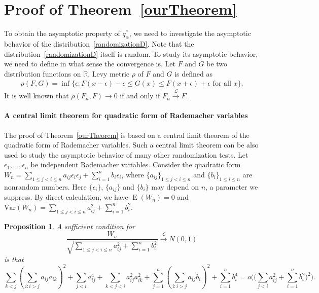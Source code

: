 \documentclass[3p]{elsarticle}
\DeclareMathOperator{\myE}{E}
\theoremstyle{plain}
\newtheorem{proposition}{\quad\quad Proposition}
\theoremstyle{definition}
\theoremstyle{remark}
\begin{document}
\section{Proof of Theorem~\ref{ourTheorem}}



To obtain the asymptotic property of $q^*_{\alpha}$, we need to investigate the asymptotic behavior of the distribution~\eqref{randomizationD}.
Note that the distribution~\eqref{randomizationD} itself is random.  To study its asymptotic behavior, we need to define in what sense the convergence is. Let $F$ and $G$ be two distribution functions on $\mathbb{R}$, Levy metric $\rho$ of $F$ and $G$ is defined as
    \begin{equation*}
    \begin{aligned}
        \rho(F,G)
        =\inf\{\epsilon:F(x-\epsilon)-\epsilon\leq G(x)\leq F(x+\epsilon)+\epsilon  \textrm{ for all } x\}.
    \end{aligned}
    \end{equation*}
It is well known that $\rho(F_n,F)\to 0$ if and only if  $F_n\xrightarrow{\mathcal{L}}F$.

\paragraph{A central limit theorem for quadratic form of Rademacher variables}
The proof of Theorem~\ref{ourTheorem} is based on a central limit theorem of the quadratic form of Rademacher variables. 
Such a central limit theorem can be also used to study the asymptotic behavior of many other randomization tests.
 Let $\epsilon_1,\ldots,\epsilon_n$ be independent Rademacher  variables. 
 Consider the quadratic form $W_n=\sum_{1\leq j<i\leq n} a_{ij}\epsilon_i \epsilon_j+\sum_{i=1}^n b_i \epsilon_i$, where $\{a_{ij}\}_{1\leq j <i \leq n}$ and $\{b_i\}_{1\leq i\leq n}$ are nonrandom numbers.
 Here $\{\epsilon_i\}$, $\{a_{ij}\}$ and $\{b_{i}\}$ may depend on $n$, a parameter we suppress.
 By direct calculation, we have $\myE(W_n)=0$ and $\mathrm{Var}(W_n)=\sum_{1\leq j<i\leq n} a_{ij}^2+\sum_{i=1}^n b_i^2$.

 \begin{proposition}\label{CLTprop}
     A sufficient condition for
     \begin{equation*}
         \frac{W_n}{\sqrt{\sum_{1\leq j<i\leq n} a_{ij}^2 +\sum_{i=1}^n b_i^2}}
         \xrightarrow{\mathcal{L}} N(0,1)
     \end{equation*}
     is that
     \begin{equation}\label{complC}
         \sum_{k<j}{(\sum_{i:i>j}a_{ij}a_{ik})}^2+
         \sum_{j<i}a_{ij}^4+
         \sum_{k<j<i}a_{ij}^2 a_{ik}^2
         +
     \sum_{j=1}^n (\sum_{i:i>j} a_{ij}b_i)^2 
         +
         \sum_{i=1}^n b_i^4
         =o\Big(\big(\sum_{j<i} a_{ij}^2+\sum_{i=1}^n b_i^2\big)^2\Big).
     \end{equation}
 \end{proposition}
\end{document}
